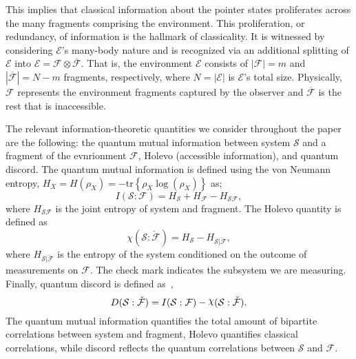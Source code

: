 \documentclass[a4paper,11pt,accepted=2024-09-14]{quantumarticle}
\newcommand{\+}         {\dagger}
\DeclareRobustCommand{\rchi}{{\mathpalette\irchi\relax}}
\newcommand{\irchi}[2]{\raisebox{\depth}{$#1\chi$}}
\newcommand{\tr}[1]{\mathrm{tr}\left\{#1\right\}}
\newcommand{\mc}[1]{\mathcal{#1}}
\begin{document}
This implies that classical information about the pointer states proliferates across the many fragments comprising the environment. This proliferation, or redundancy, of information is the hallmark of classicality. It is witnessed by considering $\mc{E}$'s many-body nature and is recognized via an additional splitting of $\mc{E}$ into $\mc{E}=\mc{F} \otimes \overline{\mc{F}}$. That is, the environment $\mc{E}$ consists of $|\mc{F}|=m$ and $|\overline{\mc{F}}| = N-m$ fragments, respectively, where $N=|\mc{E}|$ is $\mc{E}$'s total size. Physically, $\mc{F}$ represents the environment fragments captured by the observer and $\overline{\mc{F}}$ is the rest that is inaccessible. 

{The relevant information-theoretic quantities we consider throughout the paper are the following: the quantum mutual information between system $\mc{S}$ and a fragment of the evnrionment $\mc{F}$, Holevo (accessible information), and quantum discord. The quantum mutual information is defined using the von Neumann entropy, $H_{X}=H(\rho_{X})=-\tr{\rho_{X} \log(\rho_{X})}$ as;
\begin{equation}
{I}(\mc{S}:\mc{F})=H_{\mc{S}}+H_{\mc{F}}-H_{\mc{S}\mc{F}},
\label{MUTI}
\end{equation}
where $H_{\mc{S}\mc{F}}$ is the joint entropy of system and fragment. The Holevo quantity is defined as
\begin{equation}
\chi(\mc{S}:\check{\mc{F}})= H_{\mc{S}}-H_{\mc{S}|\check{\mc{F}}},
\end{equation}
where $H_{\mc{S}|\check{\mc{F}}}$ is the entropy of the system conditioned on the outcome of measurements on $\mc{F}$. The check mark indicates the subsystem we are measuring. Finally, quantum discord is defined as~\cite{discord0},
\begin{equation}
D(\mc{S}:\check{\mc{F}})= {I}(\mc{S}:\mc{F})- \rchi(\mc{S}:\check{\mc{F}}).
\end{equation}
The quantum mutual information quantifies the total amount of bipartite correlations between system and fragment, Holevo quantifies classical correlations, while discord reflects the quantum correlations between $\mc{S}$ and $\mc{F}$.
}
\end{document}
